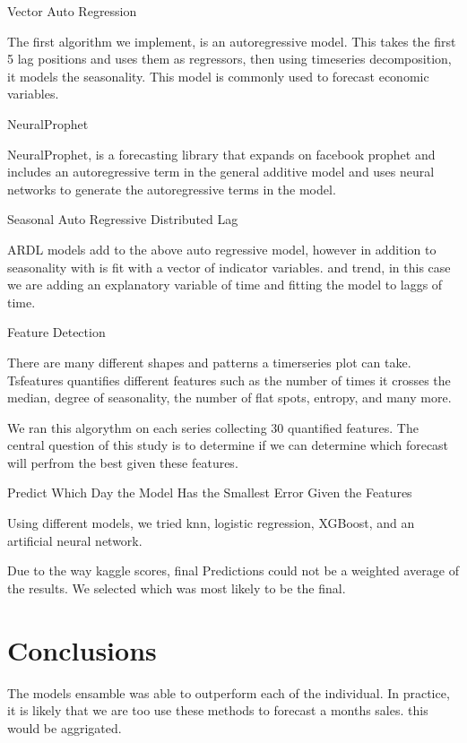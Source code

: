 \documentclass[12pt,twocolumn,letterpaper]{article}
\begin{document}
Vector Auto Regression

The first algorithm we implement, is an autoregressive model. This takes the first 5 lag positions and uses them as regressors, then using timeseries decomposition, it models the seasonality. This model is commonly used to forecast economic variables. 

NeuralProphet

NeuralProphet, is a forecasting library that expands on facebook prophet and includes an autoregressive term in the general additive model and uses neural networks to generate the autoregressive terms in the model.

Seasonal Auto Regressive Distributed Lag

ARDL models add to the above auto regressive model, however in addition to seasonality with is fit with a vector of indicator variables. and trend, in this case we are adding an explanatory variable of time and fitting the model to laggs of time.

Feature Detection

There are many different shapes and patterns a timerseries plot can take. Tsfeatures \cite{montero2020fforma} quantifies different features such as the number of times it crosses the median, degree of seasonality, the number of flat spots, entropy, and many more. 

We ran this algorythm on each series collecting 30 quantified features. The central question of this study is to determine if we can determine which forecast will perfrom the best given these features. 

Predict Which Day the Model Has the Smallest Error Given the Features

Using different models, we tried knn, logistic regression, XGBoost, and an artificial neural network. 

Due to the way kaggle scores, final Predictions could not be a weighted average of the results. We selected which was most likely to be the final.

\section{Conclusions}

The models ensamble was able to outperform each of the individual. In practice, it is likely that we are too use these methods to forecast a months sales. this would be aggrigated.



\end{document}
